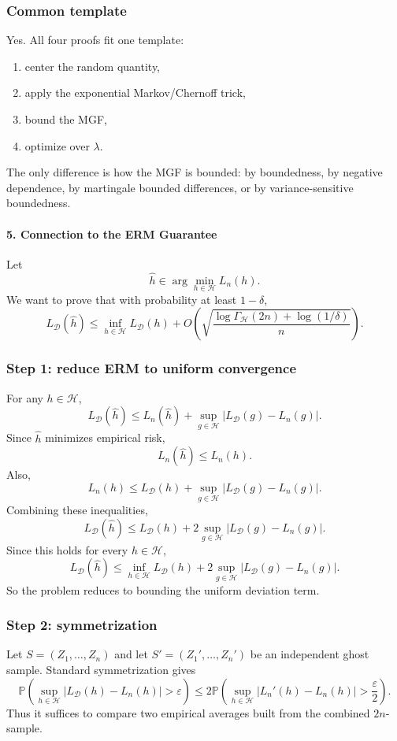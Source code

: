 \documentclass[11pt]{article}
\newcommand{\Pbb}{\mathbb{P}}
\newcommand{\calD}{\mathcal{D}}
\newcommand{\calH}{\mathcal{H}}
\newcommand{\GammaH}{\Gamma_{\mathcal{H}}}
\newcommand{\eps}{\varepsilon}
\begin{document}
\begin{solutionbox}
\subsubsection*{Common template}
Yes. All four proofs fit one template:
\begin{enumerate}[leftmargin=2em]
    \item center the random quantity,
    \item apply the exponential Markov/Chernoff trick,
    \item bound the MGF,
    \item optimize over $\lambda$.
\end{enumerate}
The only difference is how the MGF is bounded: by boundedness, by negative dependence, by martingale bounded differences, or by variance-sensitive boundedness.
 \medskip
\paragraph{5. Connection to the ERM Guarantee}
Let
\[
\hat h\in \arg\min_{h\in\calH} L_n(h).
\]
We want to prove that with probability at least $1-\delta$,
\[
L_{\calD}(\hat h)
\le
\inf_{h\in\calH} L_{\calD}(h)
+
O\!\left(\sqrt{\frac{\log\GammaH(2n)+\log(1/\delta)}{n}}\right).
\]

\subsubsection*{Step 1: reduce ERM to uniform convergence}
For any $h\in\calH$,
\[
L_{\calD}(\hat h)
\le
L_n(\hat h)+\sup_{g\in\calH}|L_{\calD}(g)-L_n(g)|.
\]
Since $\hat h$ minimizes empirical risk,
\[
L_n(\hat h)\le L_n(h).
\]
Also,
\[
L_n(h)\le L_{\calD}(h)+\sup_{g\in\calH}|L_{\calD}(g)-L_n(g)|.
\]
Combining these inequalities,
\[
L_{\calD}(\hat h)
\le
L_{\calD}(h)+2\sup_{g\in\calH}|L_{\calD}(g)-L_n(g)|.
\]
Since this holds for every $h\in\calH$,
\[
L_{\calD}(\hat h)
\le
\inf_{h\in\calH}L_{\calD}(h)+2\sup_{g\in\calH}|L_{\calD}(g)-L_n(g)|.
\]
So the problem reduces to bounding the uniform deviation term.

\subsubsection*{Step 2: symmetrization}
Let $S=(Z_1,\dots,Z_n)$ and let $S'=(Z_1',\dots,Z_n')$ be an independent ghost sample. Standard symmetrization gives
\[
\Pbb\left(\sup_{h\in\calH}|L_{\calD}(h)-L_n(h)|>\eps\right)
\le
2\Pbb\left(\sup_{h\in\calH}|L_n'(h)-L_n(h)|>\frac{\eps}{2}\right).
\]
Thus it suffices to compare two empirical averages built from the combined $2n$-sample.


\end{solutionbox}
\end{document}
